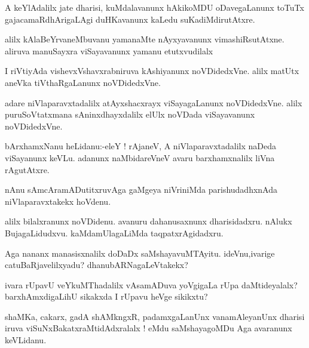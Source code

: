 \documentclass{article}
\begin{document}
\begin{mn}%
A keYlAdalilx jate dharisi, kuMdalavanunx hAkikoMDU oDavegaLanunx toTuTx 
gajacamaRdhArigaLAgi duHKavanunx kaLedu suKadiMdirutAtxre.
\end{mn}

\begin{mn}%
alilx kAlaBeYrvaneMbuvanu yamanaMte nAyxyavanunx vimashiRsutAtxne. aliruva manuSayxra 
viSayavanunx yamanu etutxvudilalx
\end{mn}

\begin{mn}%
I riVtiyAda vishevxVshavxrabniruva kAshiyanunx noVDidedxVne. alilx matUtx aneVka 
tiVthaRgaLanunx noVDidedxVne.
\end{mn}

\begin{mn}%
adare niVlaparavxtadalilx atAyxshacxrayx viSayagaLanunx noVDidedxVne. alilx 
puruSoVtatxmana sAninxdhayxdalilx elUlx noVDada viSayavanunx noVDidedxVne.
\end{mn}


\begin{mn}%
bArxhamxNanu heLidanu:-eleY ! rAjaneV, A niVlaparavxtadalilx naDeda viSayanunx keVLu. 
adanunx naMbidareVneV avaru barxhamxnalilx liVna rAgutAtxre.
\end{mn}

\begin{mn}%
nAnu sAmcAramADutitxruvAga gaMgeya niVriniMda parishudadhxnAda niVlaparavxtakekx hoVdenu.
\end{mn}

\begin{mn}%
alilx bilalxranunx noVDidenu. avanuru dahanusaxnunx dharisidadxru. nAlukx BujagaLidudxvu. 
kaMdamUlagaLiMda taqpatxrAgidadxru.
\end{mn}

\begin{mn}%
Aga nananx manasisxnalilx doDaDx saMshayavuMTAyitu. ideVnu,ivarige catuBaRjavelilxyadu? 
dhanubARNagaLeVtakekx?
\end{mn}

\begin{mn}%
ivara rUpavU veYkuMThadalilx vAsamADuva yoVgigaLa rUpa daMtideyalalx? barxhAmxdigaLihU 
sikakxda I rUpavu heVge sikikxtu?
\end{mn}

\begin{mn}%
shaMKa, cakarx, gadA shAMkngxR, padamxgaLanUnx vanamAleyanUnx dharisi iruva 
viSuNxBakatxraMtidAdxralalx ! eMdu saMshayagoMDu Aga avaranunx keVLidanu.
\end{mn}
\end{document}
